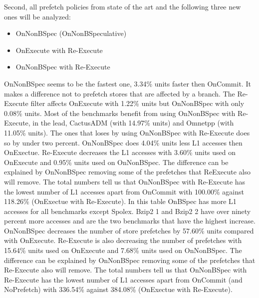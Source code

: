 Second, all prefetch policies from state of the art and the following three new ones
will be analyzed:
\begin{itemize}
    \item OnNonBSpec (OnNonBSpeculative)
    \item OnExecute with Re-Execute
    \item OnNonBSpec with Re-Execute
\end{itemize}
\resExtime
{}
OnNonBSpec seems to be the fastest one, 3.34\% units faster then OnCommit.
It makes a difference not to prefetch stores that are affected by a branch. The Re-Execute filter affects OnExecute with 1.22\% units but OnNonBSpec with only 0.08\%
units.
Most of the benchmarks benefit from using OnNonBSpec with Re-Execute, in the
lead, CactusADM (with 14.97\% units) and Omnetpp (with 11.05\% units). The ones
that loses by using OnNonBSpec with Re-Execute does so by under two percent.
\resAcc
{}
 OnNonBSpec does 4.04\% units less L1 accesses then OnExectue. Re-Execute decreases the L1 accesses with 3.60\% units used on OnExecute and 0.95\% units used on
 OnNonBSpec. The difference can be explained by OnNonBSpec removing some of the
prefetches that ReExecute also will remove. The total numbers tell us that OnNonBSpec with Re-Execute has the lowest number of L1 accesses apart from OnCommit
 with 100.00\% against 118.26\% (OnExectue with Re-Execute). 
In this table OnBSpec has more L1 accesses for all benchmarks except Spolex.
Bzip2 1 and Bzip2 2 have over ninety percent more accesses and are the two benchmarks that have the highest increase.
\resSp
{}
OnNonBSpec decreases the number of store prefetches by 57.60\% units compared
with OnExecute. Re-Execute is also decreasing the number of prefetches with 15.64\%
units used on OnExecute and 7.68\% units used on OnNonBSpec. The difference can
be explained by OnNonBSpec removing some of the prefetches that Re-Execute also
will remove. The total numbers tell us that OnNonBSpec with Re-Execute has the
lowest number of L1 accesses apart from OnCommit (and NoPrefetch) with 336.54\%
against 384.08\% (OnExectue with Re-Execute).
